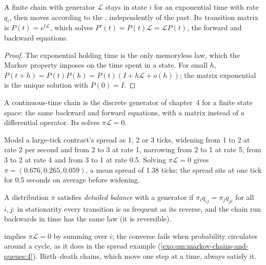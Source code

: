 \begin{proposition}\label{prop:qm:markov-chains-and-queues:kolmogorov}
A finite chain with generator $\mathcal L$ stays in state $i$ for an exponential time with rate $q_i$, then moves
according to the , independently of the past. Its transition matrix is $P(t) = e^{t\mathcal L}$, which
solves $P'(t) = P(t)\mathcal L = \mathcal LP(t)$, the forward and backward equations.
\end{proposition}

\begin{proof}
The exponential holding time is the only memoryless law, which the Markov property imposes on the time
spent in a state. For small $h$, $P(t + h) = P(t)P(h) = P(t)(I + h\mathcal L + o(h))$; the matrix exponential is the
unique solution with $P(0) = I$.
\end{proof}

A continuous-time chain is the discrete generator of chapter~4 for a finite state space: the same
backward and forward equations, with a matrix instead of a differential operator. Its  solves $\pi\mathcal L = 0$.

\begin{example}\label{ex:qm:markov-chains-and-queues:spread}
Model a large-tick contract's spread as 1, 2 or 3 ticks, widening from 1 to 2 at rate 2 per second and from 2
to 3 at rate 1, narrowing from 2 to 1 at rate 5, from 3 to 2 at rate 4 and from 3 to 1 at rate 0.5. Solving $\pi\mathcal L
= 0$ gives $\pi = (0.676, 0.265, 0.059)$, a mean spread of 1.38 ticks; the spread sits at one tick for 0.5 seconds on
average before widening.
\end{example}

\begin{definition}\label{def:qm:markov-chains-and-queues:balance}
A distribution $\pi$ satisfies \emph{detailed balance} with a generator if $\pi_iq_{ij} =
\pi_jq_{ji}$ for all $i, j$: in stationarity every transition is as frequent as its reverse, and the chain run
backwards in time has the same law (it is reversible).
\end{definition}

 implies $\pi\mathcal L = 0$ by summing over $i$; the converse fails when probability circulates
around a cycle, as it does in the spread example (\cref{exo:qm:markov-chains-and-queues:4}). Birth--death
chains, which move one step at a time, always satisfy it.


